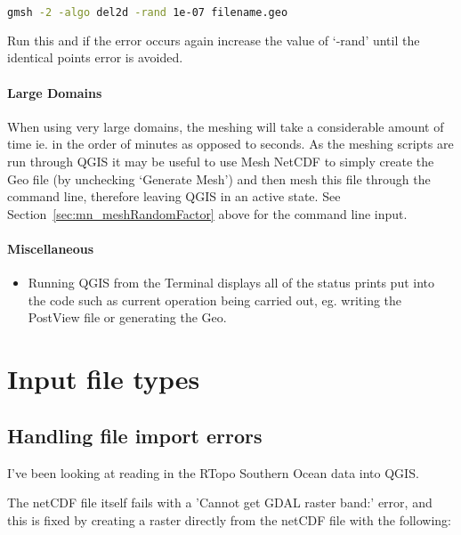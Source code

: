 \begin{example}
  \begin{lstlisting}[language=bash]
  gmsh -2 -algo del2d -rand 1e-07 filename.geo
  \end{lstlisting}
\end{example}

Run this and if the error occurs again increase the value of `-rand' until the identical points error is avoided.

\paragraph{Large Domains \\}
When using very large domains, the meshing will take a considerable amount of time ie. in the order of minutes as opposed to seconds. As the meshing scripts are run through QGIS it may be useful to use Mesh NetCDF to simply create the Geo file (by unchecking `Generate Mesh') and then mesh this file through the command line, therefore leaving QGIS in an active state. See Section~\ref{sec:mn_meshRandomFactor} above for the command line input.

\paragraph{Miscellaneous \\}
\begin{itemize}
	\item Running QGIS from the Terminal displays all of the status prints put into the code such as current operation being carried out, eg. writing the PostView file or generating the Geo.
\end{itemize}






\newpage
		
\section{Input file types}
\subsection{Handling file import errors}

I've been looking at reading in the RTopo Southern Ocean data into QGIS.

The netCDF file itself fails with a 'Cannot get GDAL raster band:' error, and this is fixed by creating a raster directly from the netCDF file with the following:

